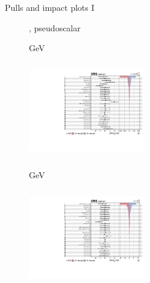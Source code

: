 \documentclass[8pt]{beamer}
\begin{document}
\begin{frame}{Pulls and impact plots I}
\justifying
\begin{figure}[htbp]
\centering
\begin{block}{, pseudoscalar}\end{block}	\vspace{-8pt}

\begin{minipage}[b]{0.49\textwidth}
\begin{center}
\centering \begin{block}{ GeV}\end{block}	
\includegraphics[width=5.1cm, height=4.2cm]{figs/impacts_2016_both_pseudo_100.pdf}
\end{center}
\end{minipage}\hfill
\begin{minipage}[b]{0.49\textwidth}
\begin{center}
\centering \begin{block}{ GeV}\end{block}	
\includegraphics[width=5.1cm, height=4.2cm]{figs/impacts_2016_both_pseudo_500.pdf}
\end{center}
\end{minipage} \hfill
\end{figure}
\end{frame}
\end{document}
